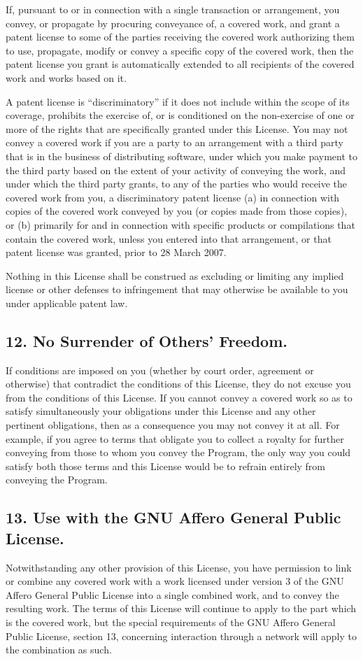 If, pursuant to or in connection with a single transaction or arrangement, you convey, or propagate by procuring conveyance of, a covered work, and grant a patent license to some of the parties receiving the covered work authorizing them to use, propagate, modify or convey a specific copy of the covered work, then the patent license you grant is automatically extended to all recipients of the covered work and works based on it.\par
A patent license is “discriminatory” if it does not include within the scope of its coverage, prohibits the exercise of, or is conditioned on the non-exercise of one or more of the rights that are specifically granted under this License. You may not convey a covered work if you are a party to an arrangement with a third party that is in the business of distributing software, under which you make payment to the third party based on the extent of your activity of conveying the work, and under which the third party grants, to any of the parties who would receive the covered work from you, a discriminatory patent license (a) in connection with copies of the covered work conveyed by you (or copies made from those copies), or (b) primarily for and in connection with specific products or compilations that contain the covered work, unless you entered into that arrangement, or that patent license was granted, prior to 28 March 2007.\par
Nothing in this License shall be construed as excluding or limiting any implied license or other defenses to infringement that may otherwise be available to you under applicable patent law.
\subsection{12. No Surrender of Others' Freedom.}
If conditions are imposed on you (whether by court order, agreement or otherwise) that contradict the conditions of this License, they do not excuse you from the conditions of this License. If you cannot convey a covered work so as to satisfy simultaneously your obligations under this License and any other pertinent obligations, then as a consequence you may not convey it at all. For example, if you agree to terms that obligate you to collect a royalty for further conveying from those to whom you convey the Program, the only way you could satisfy both those terms and this License would be to refrain entirely from conveying the Program.
\subsection{13. Use with the GNU Affero General Public License.}
Notwithstanding any other provision of this License, you have permission to link or combine any covered work with a work licensed under version 3 of the GNU Affero General Public License into a single combined work, and to convey the resulting work. The terms of this License will continue to apply to the part which is the covered work, but the special requirements of the GNU Affero General Public License, section 13, concerning interaction through a network will apply to the combination as such.
